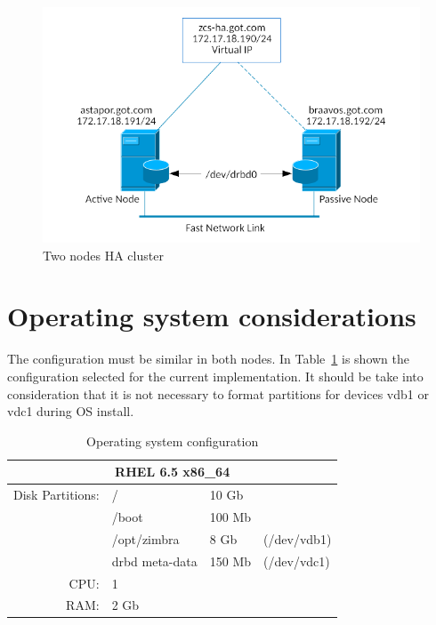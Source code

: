 \documentclass[a4paper, 12pt]{book}
\begin{document}
\FloatBarrier
\begin{figure}
  \centering
  \includegraphics[scale=0.50]{two_nodes_ha_cluster.png}
  \caption[Two nodes HA cluster]{Two nodes HA cluster}
  \label{fig:ha-cluster}
\end{figure}


\section{Operating system considerations}
\label{sec:considerations}

The configuration must be similar in both nodes. In Table~\ref{table:os} is shown the configuration selected for the current implementation. It should be take into consideration that it is not necessary to format partitions for devices vdb1 or vdc1 during OS install.

\FloatBarrier
\begin{table}[H]
  \centering
  \begin{tabular}{ | r l l l | }
  
    \hline    
    \multicolumn{4}{|c|}{\textbf{RHEL 6.5 x86\_64}}\\
    \hline
    Disk Partitions: & /              & 10 Gb  & \\
                     & /boot          & 100 Mb & \\
                     & /opt/zimbra    & 8 Gb   & (/dev/vdb1)\\
                     & drbd meta-data & 150 Mb & (/dev/vdc1)\\
    CPU:             & 1              &        & \\
    RAM:			 & 2 Gb 		  &        & \\
    \hline
  \end{tabular}
\caption{Operating system configuration}
\label{table:os}
\end{table}
\end{document}
